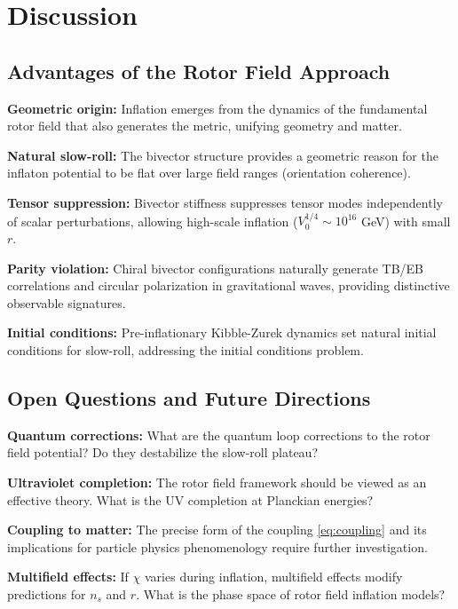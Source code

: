 \documentclass[11pt,a4paper]{article}
\numberwithin{equation}{section}
\theoremstyle{plain}
\theoremstyle{definition}
\theoremstyle{remark}
\begin{document}
\section{Discussion}
\label{sec:discussion}

\subsection{Advantages of the Rotor Field Approach}

\textbf{Geometric origin:} Inflation emerges from the dynamics of the fundamental rotor field that also generates the metric, unifying geometry and matter.

\textbf{Natural slow-roll:} The bivector structure provides a geometric reason for the inflaton potential to be flat over large field ranges (orientation coherence).

\textbf{Tensor suppression:} Bivector stiffness suppresses tensor modes independently of scalar perturbations, allowing high-scale inflation ($V_0^{1/4} \sim 10^{16}$ GeV) with small $r$.

\textbf{Parity violation:} Chiral bivector configurations naturally generate TB/EB correlations and circular polarization in gravitational waves, providing distinctive observable signatures.

\textbf{Initial conditions:} Pre-inflationary Kibble-Zurek dynamics set natural initial conditions for slow-roll, addressing the initial conditions problem.

\subsection{Open Questions and Future Directions}

\textbf{Quantum corrections:} What are the quantum loop corrections to the rotor field potential? Do they destabilize the slow-roll plateau?

\textbf{Ultraviolet completion:} The rotor field framework should be viewed as an effective theory. What is the UV completion at Planckian energies?

\textbf{Coupling to matter:} The precise form of the coupling \eqref{eq:coupling} and its implications for particle physics phenomenology require further investigation.

\textbf{Multifield effects:} If $\chi$ varies during inflation, multifield effects modify predictions for $n_s$ and $r$. What is the phase space of rotor field inflation models?
\end{document}
